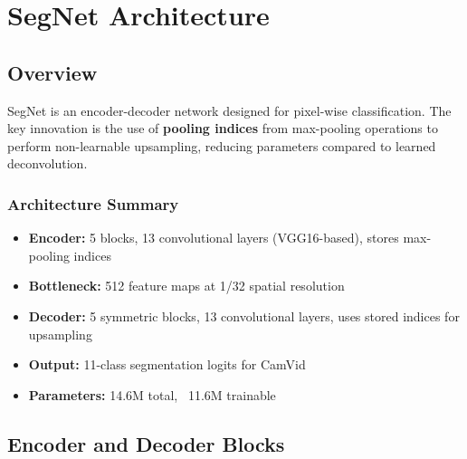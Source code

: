 \documentclass[11pt,a4paper]{report}
\begin{document}
\chapter{SegNet Architecture}

\section{Overview}

SegNet is an encoder-decoder network designed for pixel-wise classification. The key innovation is the use of \textbf{pooling indices} from max-pooling operations to perform non-learnable upsampling, reducing parameters compared to learned deconvolution.

\subsection*{Architecture Summary}
\begin{itemize}
  \item \textbf{Encoder:} 5 blocks, 13 convolutional layers (VGG16-based), stores max-pooling indices
  \item \textbf{Bottleneck:} 512 feature maps at 1/32 spatial resolution
  \item \textbf{Decoder:} 5 symmetric blocks, 13 convolutional layers, uses stored indices for upsampling
  \item \textbf{Output:} 11-class segmentation logits for CamVid
  \item \textbf{Parameters:} 14.6M total, ~11.6M trainable
\end{itemize}

\section{Encoder and Decoder Blocks}
\end{document}
